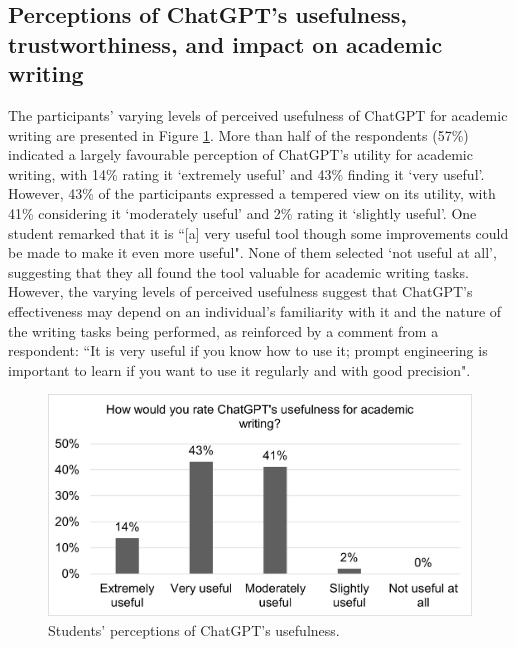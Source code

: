 \documentclass[english]{textolivre}
\begin{document}
\subsection{Perceptions of ChatGPT’s usefulness, trustworthiness, and impact on academic writing}

The participants’ varying levels of perceived usefulness of ChatGPT for academic writing are presented in Figure \ref{fig-5}. More than half of the respondents (57\%) indicated a largely favourable perception of ChatGPT’s utility for academic writing, with 14\% rating it ‘extremely useful’ and 43\% finding it ‘very useful’. However, 43\% of the participants expressed a tempered view on its utility, with 41\% considering it ‘moderately useful’ and 2\% rating it ‘slightly useful’. One student remarked that it is ``[a] very useful tool though some improvements could be made to make it even more useful". None of them selected ‘not useful at all’, suggesting that they all found the tool valuable for academic writing tasks. However, the varying levels of perceived usefulness suggest that ChatGPT’s effectiveness may depend on an individual’s familiarity with it and the nature of the writing tasks being performed, as reinforced by a comment from a respondent: ``It is very useful if you know how to use it; prompt engineering is important to learn if you want to use it regularly and with good precision".

\begin{figure}[h!]
    \centering
    \begin{minipage}{0.80\linewidth}
    \includegraphics[width=\linewidth]{Imagens/FIGURA5.png}
    \caption{Students’ perceptions of ChatGPT’s usefulness.}
    \label{fig-5}
    \end{minipage}
\end{figure}
\end{document}
